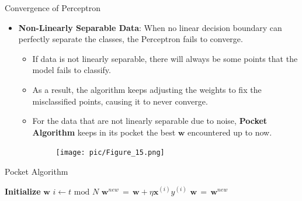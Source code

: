 \documentclass[serif, aspectratio=169]{beamer}
\begin{document}
\begin{frame}{Convergence of Perceptron}
    \begin{itemize}\itemsep1.5em
        \item \textbf{Non-Linearly Separable Data}:
        When no linear decision boundary can perfectly separate the classes, the Perceptron fails to converge.
        \medskip
        \begin{itemize}\itemsep1em
            \item If data is not linearly separable, there will always be some points that the model fails to classify.
            \item As a result, the algorithm keeps adjusting the weights to fix the misclassified points, causing it to never converge.
            \item For the data that are not linearly separable due to noise, \textbf{Pocket Algorithm} keeps in its pocket the best \(\mathbf{w}\) encountered up to now.
        \endminipage
        \hspace{1.5cm}
        \begin{figure}
            \centering
            \texttt{[image: pic/Figure\_15.png]}
        \end{figure}
        \endminipage
        \end{itemize}
    \end{itemize}
    \vfill
\end{frame}

\begin{frame}{Pocket Algorithm}
    \begin{algorithm}[H]
    \caption{Pocket Algorithm}\label{alg:Pocket Algorithm}
    \begin{algorithmic}[1]
        \State \textbf{Initialize} $\mathbf{w}$
            \State \(i \leftarrow t \text{ mod } N\)
            \State \(\mathbf{w}^{new} \, = \, \mathbf{w} + \eta \mathbf{x}^{(i)}y^{(i)}\)
            \State \(\mathbf{w} \, = \, \mathbf{w}^{new}\)
            \EndIf
            \EndIf
        \EndFor
    \end{algorithmic}
    \end{algorithm}
\end{frame}
\end{document}
